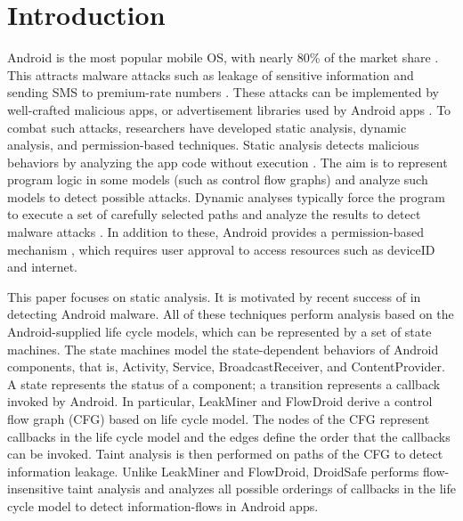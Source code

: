 \documentclass[10pt]{elsarticle}
\begin{document}
\section{Introduction}

Android is the most popular mobile OS, with nearly 80\% of the market share \cite{IDCReport}. This attracts malware attacks such as leakage of sensitive information and sending SMS to premium-rate numbers \cite{FSecureReport, APFeltSurvey}. These attacks can be implemented by well-crafted malicious apps, or advertisement libraries used by Android apps \cite{adLibraries}. To combat such attacks, researchers have developed static analysis, dynamic analysis, and permission-based techniques. Static analysis detects malicious behaviors by analyzing the app code without execution \cite{LeakMiner, FlowDroid, AppoScopy, myDroid, Chex}. The aim is to represent program logic in some models (such as control flow graphs) and analyze such models to detect possible attacks. Dynamic analyses typically force the program to execute a set of carefully selected paths and analyze the results to detect malware attacks \cite{TaintDroid, VetDroid, DroidScope, DroidPF}. In addition to these, Android provides a permission-based mechanism \cite{permissions}, which requires user approval to access resources such as deviceID and internet. 

This paper focuses on static analysis. It is motivated by recent success of \cite{LeakMiner, FlowDroid, DroidSafe, AppoScopy, Chex, myDroid} in detecting Android malware. All of these techniques perform analysis based on the Android-supplied life cycle models, which can be represented by a set of state machines. The state machines model the state-dependent behaviors of Android components, that is, Activity, Service, BroadcastReceiver, and ContentProvider. A state represents the status of a component; a transition represents a callback invoked by Android. In particular, LeakMiner \cite {LeakMiner} and FlowDroid \cite{FlowDroid} derive a control flow graph (CFG) based on life cycle model. The nodes of the CFG represent callbacks in the life cycle model and the edges define the order that the callbacks can be invoked. Taint analysis is then performed on paths of the CFG to detect information leakage. Unlike LeakMiner and FlowDroid, DroidSafe \cite{DroidSafe} performs flow-insensitive taint analysis and analyzes all possible orderings of callbacks in the life cycle model to detect information-flows in Android apps. 
\end{document}
